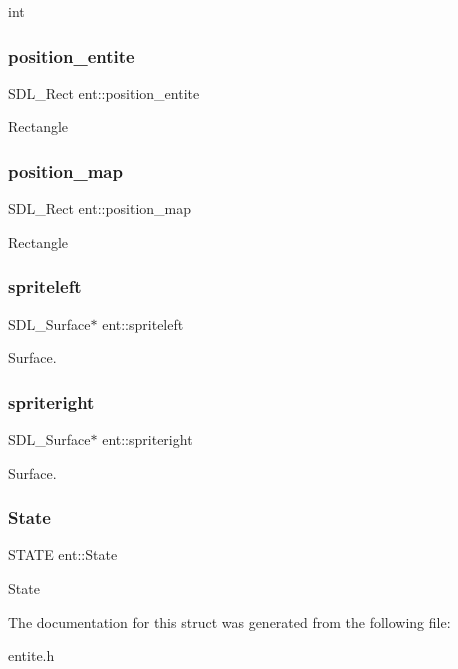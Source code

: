 int \mbox{\label{structent_a6a1d1ef8616b14a98ae9532cfb8c33e9}} 
\subsubsection{\texorpdfstring{position\+\_\+entite}{position\_entite}}
{\footnotesize\ttfamily S\+D\+L\+\_\+\+Rect ent\+::position\+\_\+entite}

Rectangle \mbox{\label{structent_afea8f34bcada346f59d98f2fa13c64b8}} 
\subsubsection{\texorpdfstring{position\+\_\+map}{position\_map}}
{\footnotesize\ttfamily S\+D\+L\+\_\+\+Rect ent\+::position\+\_\+map}

Rectangle \mbox{\label{structent_a7d33febca51de6fcf732a69aaf3b7fed}} 
\subsubsection{\texorpdfstring{spriteleft}{spriteleft}}
{\footnotesize\ttfamily S\+D\+L\+\_\+\+Surface$\ast$ ent\+::spriteleft}

Surface. \mbox{\label{structent_a8e2ca44dcbfe4e2f948a2b45cfa3724f}} 
\subsubsection{\texorpdfstring{spriteright}{spriteright}}
{\footnotesize\ttfamily S\+D\+L\+\_\+\+Surface$\ast$ ent\+::spriteright}

Surface. \mbox{\label{structent_a430bce59586932a67536661d020a1347}} 
\subsubsection{\texorpdfstring{State}{State}}
{\footnotesize\ttfamily S\+T\+A\+TE ent\+::\+State}

State 

The documentation for this struct was generated from the following file\+:\begin{DoxyCompactItemize}
\item 
entite.\+h\end{DoxyCompactItemize}
